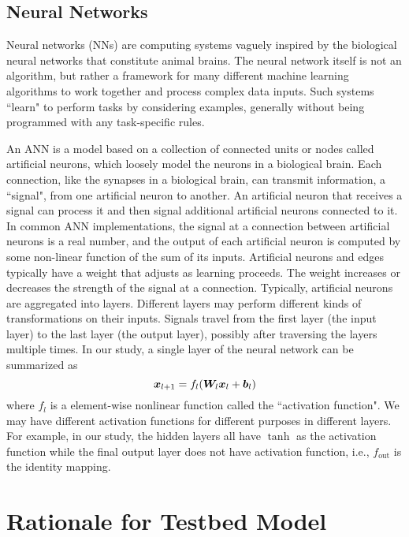 \subsection{Neural Networks}
\par Neural networks (NNs) are computing systems vaguely inspired by the biological neural networks that constitute animal brains. The neural network itself is not an algorithm, but rather a framework for many different machine learning algorithms to work together and process complex data inputs. Such systems ``learn" to perform tasks by considering examples, generally without being programmed with any task-specific rules.
\par An ANN is a model based on a collection of connected units or nodes called artificial neurons, which loosely model the neurons in a biological brain. Each connection, like the synapses in a biological brain, can transmit information, a ``signal", from one artificial neuron to another. An artificial neuron that receives a signal can process it and then signal additional artificial neurons connected to it. In common ANN implementations, the signal at a connection between artificial neurons is a real number, and the output of each artificial neuron is computed by some non-linear function of the sum of its inputs. Artificial neurons and edges typically have a weight that adjusts as learning proceeds. The weight increases or decreases the strength of the signal at a connection. Typically, artificial neurons are aggregated into layers. Different layers may perform different kinds of transformations on their inputs. Signals travel from the first layer (the input layer) to the last layer (the output layer), possibly after traversing the layers multiple times. In our study, a single layer of the neural network can be summarized as
\begin{equation}
\bm{x}_{l+1}=f_l(\bm{W}_l \bm{x}_{l}+\bm{b}_l)
\end{equation}
where $f_l$ is a element-wise nonlinear function called the ``activation function". We may have different activation functions for different purposes in different layers. For example, in our study, the hidden layers all have $\tanh$ as the activation function while the final output layer does not have activation function, i.e., $f_{\text{out}}$ is the identity mapping.

\section{Rationale for Testbed Model}

